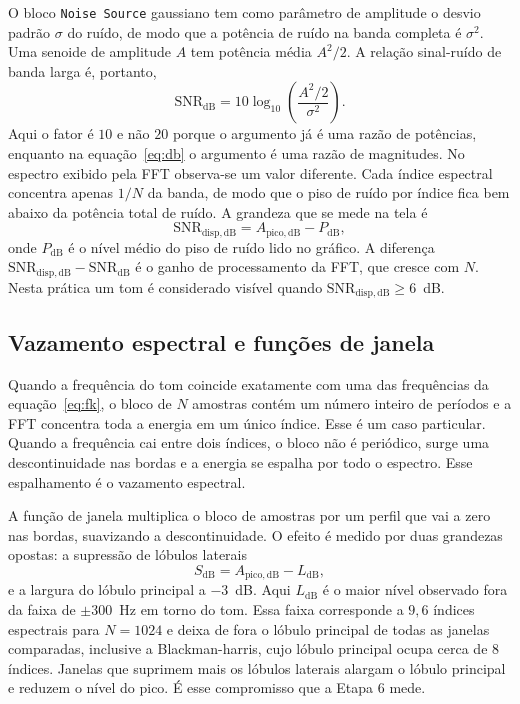 \documentclass[11pt,a4paper]{article}
\begin{document}
O bloco \texttt{Noise Source} gaussiano tem como parâmetro de amplitude o
desvio padrão $\sigma$ do ruído, de modo que a potência de ruído na banda
completa é $\sigma^2$. Uma senoide de amplitude $A$ tem potência média
$A^2/2$. A relação sinal-ruído de banda larga é, portanto,
\begin{equation}
  \mathrm{SNR}_{\mathrm{dB}}
    = 10\log_{10}\!\left(\frac{A^{2}/2}{\sigma^{2}}\right) .
  \label{eq:snr}
\end{equation}
Aqui o fator é $10$ e não $20$ porque o argumento já é uma razão de potências,
enquanto na equação~\eqref{eq:db} o argumento é uma razão de magnitudes.
No espectro exibido pela FFT observa-se um valor diferente. Cada índice
espectral concentra apenas $1/N$ da banda, de modo que o piso de ruído por
índice fica bem abaixo da potência total de ruído. A grandeza que se mede na
tela é
\begin{equation}
  \mathrm{SNR}_{\mathrm{disp,dB}} = A_{\mathrm{pico,dB}} - P_{\mathrm{dB}} ,
  \label{eq:snrdisp}
\end{equation}
onde $P_{\mathrm{dB}}$ é o nível médio do piso de ruído lido no gráfico. A
diferença $\mathrm{SNR}_{\mathrm{disp,dB}} - \mathrm{SNR}_{\mathrm{dB}}$ é o
ganho de processamento da FFT, que cresce com $N$. Nesta prática um tom é
considerado visível quando
$\mathrm{SNR}_{\mathrm{disp,dB}} \geq 6$~dB.

\subsection*{Vazamento espectral e funções de janela}

Quando a frequência do tom coincide exatamente com uma das frequências da
equação~\eqref{eq:fk}, o bloco de $N$ amostras contém um número inteiro de
períodos e a FFT concentra toda a energia em um único índice. Esse é um caso
particular. Quando a frequência cai entre dois índices, o bloco não é
periódico, surge uma descontinuidade nas bordas e a energia se espalha por
todo o espectro. Esse espalhamento é o vazamento espectral.

A função de janela multiplica o bloco de amostras por um perfil que vai a zero
nas bordas, suavizando a descontinuidade. O efeito é medido por duas grandezas
opostas: a supressão de lóbulos laterais
\begin{equation}
  S_{\mathrm{dB}} = A_{\mathrm{pico,dB}} - L_{\mathrm{dB}} ,
  \label{eq:supressao}
\end{equation}
e a largura do lóbulo principal a $-3$~dB. Aqui $L_{\mathrm{dB}}$ é o maior
nível observado fora da faixa de $\pm 300$~Hz em torno do tom. Essa faixa corresponde a
$9{,}6$ índices espectrais para $N = 1024$ e deixa de fora o lóbulo principal
de todas as janelas comparadas, inclusive a Blackman-harris, cujo lóbulo
principal ocupa cerca de 8 índices. Janelas que suprimem mais os lóbulos
laterais alargam o lóbulo principal e reduzem o nível do pico. É esse
compromisso que a Etapa 6 mede.
\end{document}
